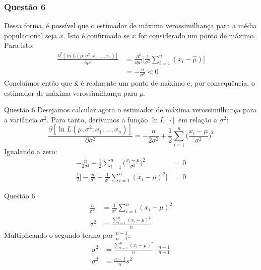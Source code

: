 \documentclass{beamer}\usepackage[]{graphicx}\usepackage[]{color}
\begin{document}
		\begin{frame}
			\frametitle{Questão 6}
			Dessa forma, é possível que o estimador de máxima verossimilhança para a média populacional seja $\bar{x}$.  Isto é confirmado se $\bar{x}$ for considerado um ponto de máximo.  Para isto:
			\begin{align*}
				\frac{\partial^{2}[ \ln   L(\mu,\sigma^{2};x_{1},\dots,x_{n})]}{\partial \mu^{2}} &= \frac{\partial^{2}}{\partial \mu^{2}} \bigg[ \frac{1}{\sigma^{2}}\sum_{i=1}^{n}(x_{i}-\hat{\mu})\bigg]\\
				&= -\frac{n}{\sigma^{2}} < 0
			\end{align*}
			Concluímos então que $\boldsymbol{\bar{x}}$ é realmente um ponto de máximo e, por consequência, o estimador de máxima verossimilhança para $\mu$.
		\end{frame}
	
		\begin{frame}{Questão 6}
			Desejamos calcular agora o estimador de máxima verossimilhança para a variância $\sigma^{2}$.  Para tanto, derivamos a função $\ln L[\cdot]$ em relação a $\sigma^{2}$:
			$$\frac{\partial  [ \ln L(\mu,\sigma^{2};x_{1},\dots,x_{n})]}{\partial \sigma^{2}} = -\frac{n}{2\sigma^{2}}+\frac{1}{2}\sum_{i=1}^{n}\bigg(\frac{x_{i}-\mu}{\sigma^{2}}\bigg)^{2}$$
			Igualando a zero:
			\begin{align*}
				-\frac{n}{2\sigma^{2}}+\frac{1}{2}\sum_{i=1}^{n}\bigg(\frac{x_{i}-\mu}{\sigma^{2}}\bigg)^{2} &= 0\\
				\frac{1}{2}\bigg[ -\frac{n}{\sigma^{2}} + \frac{1}{\sigma^{4}}\sum_{i=1}^{n}(x_{i}-\mu)^{2}\bigg] &= 0 
			\end{align*}
		\end{frame}
		
		\begin{frame}{Questão 6}
			\begin{align*}
				\frac{n}{\sigma^{2}} &= \frac{1}{\sigma^{4}}\sum_{i=1}^{n}(x_{i}-\mu)^{2}\\
				\sigma^{2} &= \frac{\sum_{i=1}^{n}(x_{i}-\mu)^{2}}{n}				
			\end{align*}
			Multiplicando o segundo termo por $\frac{n-1}{n-1}$:
			\begin{align*}
			\sigma^{2} &= \frac{\sum_{i=1}^{n}(x_{i}-\mu)^{2}}{n} \cdot \frac{n-1}{n-1}\\
			\sigma^{2} &= \frac{n-1}{n}s^{2}\\				
			\end{align*}
		\end{frame}
	
\end{document}
